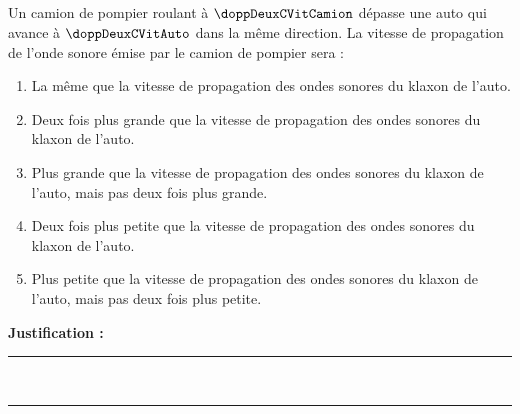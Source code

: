 \subsection{}
Un camion de pompier roulant à $\doppDeuxCVitCamion$ dépasse une auto qui avance à $\doppDeuxCVitAuto$ dans la même direction. La vitesse de propagation de l’onde sonore émise par le camion de pompier sera :
\begin{enumerate}[label=\Alph*)]
    \item La même que la vitesse de propagation des ondes sonores du klaxon de l’auto.
    \item Deux fois plus grande que la vitesse de propagation des ondes sonores du klaxon de l’auto.
    \item Plus grande que la vitesse de propagation des ondes sonores du klaxon de l’auto, mais pas deux fois plus grande.
    \item Deux fois plus petite que la vitesse de propagation des ondes sonores du klaxon de l’auto.
    \item Plus petite que la vitesse de propagation des ondes sonores du klaxon de l’auto, mais pas deux fois plus petite.
\end{enumerate}

\noindent\textbf{Justification :} \hrulefill \\[2.5ex]
\rule{\linewidth}{0.4pt} \\[2.5ex]
\rule{\linewidth}{0.4pt}
\vfill